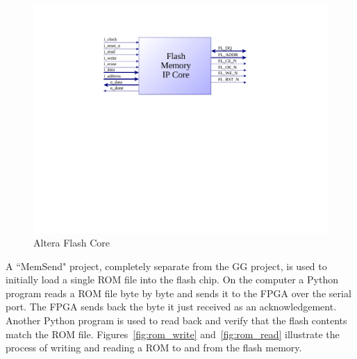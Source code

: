 \documentclass{article}
\begin{document}
\begin{figure}[H]
\centering
\includegraphics[scale=0.5]{../images/flash_core.pdf}
\caption{Altera Flash Core}
\label{fig:flash_core}
\end{figure}

A ``MemSend" project, completely separate from the GG project, is used to
initially load a single ROM file into the flash chip.  On the computer a Python
program reads a ROM file byte by byte and sends it to the FPGA over the serial
port. The FPGA sends back the byte it just received as an acknowledgement.
Another Python program is used to read back and verify that the flash contents
match the ROM file. Figures~\ref{fig:rom_write} and~\ref{fig:rom_read}
illustrate the process of writing and reading a ROM to and from the flash
memory.
\end{document}
